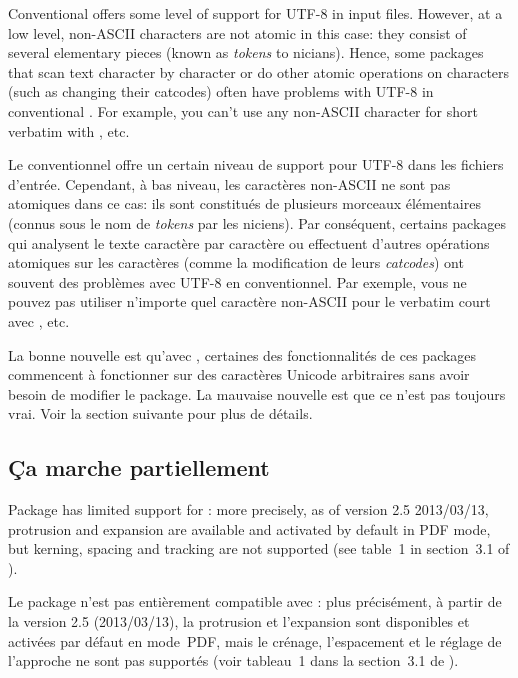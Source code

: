 \documentclass{lltxdoc}
\begin{document}
{
Conventional \latex offers some level of support for UTF-8 in input files.
However, at a low level, non-ASCII characters are not atomic in this case:
they consist of several elementary pieces (known as \emph{tokens} to
\tex{}nicians). Hence, some packages that scan text character by character or
do other atomic operations on characters (such as changing their catcodes)
often have problems with UTF-8 in conventional \latex. For example, you can't
use any non-ASCII character for short verbatim with , etc.

Le \latex conventionnel offre un certain niveau de support pour UTF-8 dans les fichiers d'entrée. Cependant, à bas niveau, les caractères non-ASCII ne sont pas atomiques dans ce cas: ils sont constitués de plusieurs morceaux élémentaires (connus sous le nom de \emph{tokens} par les \tex{}niciens). Par conséquent, certains packages qui analysent le texte caractère par caractère ou effectuent d'autres opérations atomiques sur les caractères (comme la modification de leurs \emph{catcodes}) ont souvent des problèmes avec UTF-8 en \latex conventionnel. Par exemple, vous ne pouvez pas utiliser n'importe quel caractère non-ASCII pour le verbatim court avec , etc.

La bonne nouvelle est qu'avec \lualatex, certaines des fonctionnalités de ces packages
commencent à fonctionner sur des caractères Unicode arbitraires sans avoir besoin de
modifier le package. La mauvaise nouvelle est que ce n'est pas toujours vrai.
Voir la section suivante pour plus de détails.

\subsection{Ça marche partiellement}\label{partial}

Package  has limited support for \luatex: more precisely, as of
version 2.5 2013/03/13, protrusion and expansion are available and activated
by default in PDF mode, but kerning, spacing and tracking are not supported
(see table~1 in section~3.1 of ).

Le package  n'est pas entièrement compatible avec \luatex: plus précisément, à partir de la version 2.5 (2013/03/13), la protrusion et l'expansion sont disponibles et activées par défaut en mode~PDF, mais le crénage, l'espacement et le réglage de l'approche ne sont pas supportés (voir tableau~1 dans la section~3.1 de ).

}
\end{document}
